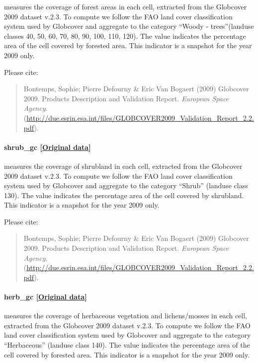 \documentclass[]{book}
\begin{document}
measures the coverage of forest areas in each cell, extracted from the
Globcover 2009 dataset v.2.3. To compute  we follow
the FAO land cover classification system used by Globcover and aggregate
to the category ``Woody - trees''(landuse classes 40, 50, 60, 70, 80,
90, 100, 110, 120). The value indicates the percentage area of the cell
covered by forested area. This indicator is a snapshot for the year 2009
only.

Please cite:

\begin{quote}
Bontemps, Sophie; Pierre Defourny \& Eric Van Bogaert (2009) Globcover
2009. Products Description and Validation Report. \emph{European Space
Agency}.
(\url{http://due.esrin.esa.int/files/GLOBCOVER2009_Validation_Report_2.2.pdf}).
\end{quote}

\paragraph{shrub\_gc
{[}\href{http://due.esrin.esa.int/page_globcover.php}{Original
data}{]}}\label{shrub-gc}

measures the coverage of shrubland in each cell, extracted from the
Globcover 2009 dataset v.2.3. To compute  we follow
the FAO land cover classification system used by Globcover and aggregate
to the category ``Shrub'' (landuse class 130). The value indicates the
percentage area of the cell covered by shrubland. This indicator is a
snapshot for the year 2009 only.

Please cite:

\begin{quote}
Bontemps, Sophie; Pierre Defourny \& Eric Van Bogaert (2009) Globcover
2009. Products Description and Validation Report. \emph{European Space
Agency}.
(\url{http://due.esrin.esa.int/files/GLOBCOVER2009_Validation_Report_2.2.pdf}).
\end{quote}

\paragraph{herb\_gc
{[}\href{http://due.esrin.esa.int/page_globcover.php}{Original
data}{]}}\label{herb-gc}

measures the coverage of herbaceous vegetation and lichens/mosses in
each cell, extracted from the Globcover 2009 dataset v.2.3. To compute
 we follow the FAO land cover classification system
used by Globcover and aggregate to the category ``Herbaceous'' (landuse
class 140). The value indicates the percentage area of the cell covered
by forested area. This indicator is a snapshot for the year 2009 only.
\end{document}
